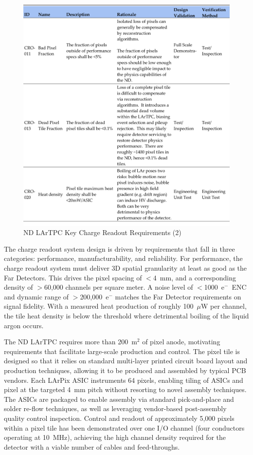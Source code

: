 \begin{figure}
\centering 
\includegraphics[width=1\linewidth]{graphics/lartpc/0Req/NDCROreqs2.pdf}
\caption{\label{fig:lartpccroreq2} ND LArTPC Key Charge Readout Requirements (2)}
\end{figure}


The charge readout system design is driven by requirements that fall in three categories: performance, manufacturability, and reliability.
For performance, the charge readout system must deliver 3D spatial granularity at least as good as the Far Detectors.
This drives the pixel spacing of $<$4~mm, and a corresponding density of $>$60,000 channels per square meter.
A noise level of $<$1000~e$^-$~ENC and dynamic range of $>$200,000~e$^-$ matches the Far Detector requirements on signal fidelity.
With a measured heat production of roughly 100~$\mu$W per channel, the tile heat density is below the threshold where detrimental boiling of the liquid argon occurs.

The ND LArTPC requires more than 200~m$^2$ of pixel anode, motivating requirements that facilitate large-scale production and control.
The pixel tile is designed so that it relies on standard multi-layer printed circuit board layout and production techniques, allowing it to be produced and assembled by typical PCB vendors.
Each LArPix ASIC instruments 64 pixels, enabling tiling of ASICs and pixel at the targeted 4~mm pitch without resorting to novel assembly techniques.
The ASICs are packaged to enable assembly via standard pick-and-place and solder re-flow techniques, as well as leveraging vendor-based post-assembly quality control inspection.
Control and readout of approximately 5,000 pixels within a pixel tile has been demonstrated over one I/O channel (four conductors operating at 10~MHz), achieving the high channel density required for the detector with a viable number of cables and feed-throughs.

